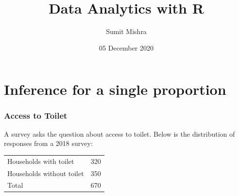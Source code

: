 \documentclass[notes,11pt, aspectratio=169]{beamer}
\title[DAR]{Data Analytics with R}  %
\author{Sumit Mishra} %
\institute[IFMR] %
{
  Institute for Financial Management and Research, Sri City \\ %
  \medskip
  \medskip
  \textbf{Inference for Categorical Data} %
}
\date{05 December 2020} %
\begin{document}

  
 {
    \addtocounter{framenumber}{-1} 
    {\removepagenumbers 
      \begin{frame}
      
      
      \titlepage
      
      \end{frame}
    }
  }





\section{Inference for a single proportion}



\begin{frame}
\frametitle{Access to Toilet}

A survey asks the question about access to toilet. Below is the distribution of responses from a 2018 survey: \\

\begin{center}
\begin{tabular}{l c}
Households with toilet		& 320 \\
Households without toilet	& 350 \\
\hline
Total						& 670
\end{tabular}
\end{center}

\end{frame}

\end{document}
